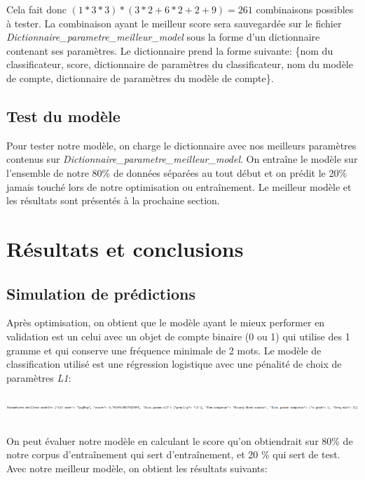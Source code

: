 \documentclass[12pt,french]{article}
\begin{document}
Cela fait donc $(1*3*3) *(3*2 + 6*2 + 2 + 9)=261$ combinaisons possibles à tester. La combinaison ayant le meilleur score sera sauvegardée sur le fichier \emph{Dictionnaire\_parametre\_meilleur\_model} sous la forme d'un dictionnaire contenant ses paramètres. Le dictionnaire prend la forme suivante: \{nom du classificateur, score, dictionnaire de paramètres du classificateur, nom du modèle de compte, dictionnaire de paramètres du modèle de compte\}.

\subsection*{Test du modèle}
Pour tester notre modèle, on charge le dictionnaire avec nos meilleurs paramètres contenus sur \emph{Dictionnaire\_parametre\_meilleur\_model}. On entraîne le modèle sur l'ensemble de notre 80\% de données séparées au tout début et on prédit le 20\% jamais touché lors de notre optimisation ou entraînement. Le meilleur modèle et les résultats sont présentés à la prochaine section.

\clearpage




\section{Résultats et conclusions}
\subsection*{Simulation de prédictions}
Après optimisation, on obtient que le modèle ayant le mieux performer en validation est un celui avec un objet de compte binaire (0 ou 1) qui utilise des 1 gramme et qui conserve une fréquence minimale de 2 mots. Le modèle de classification utilisé est une régression logistique avec une pénalité de choix de paramètres \emph{L1}:

\includegraphics[width=\linewidth,height=1cm,keepaspectratio]{dict_meilleur_model}

On peut évaluer notre modèle en calculant le score qu'on obtiendrait sur 80\% de notre corpus d'entraînement qui sert d'entraînement, et 20 \% qui sert de test. Avec notre meilleur modèle, on obtient les résultats suivants:
\end{document}
